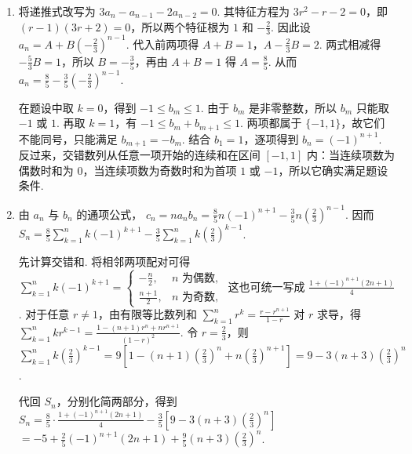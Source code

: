\begin{solution}
\begin{enumerate}
\item 将递推式改写为 \(3a_n-a_{n-1}-2a_{n-2}=0\). 其特征方程为 \(3r^2-r-2=0\)，即 \((r-1)(3r+2)=0\)，所以两个特征根为 \(1\) 和 \(-\frac23\). 因此设
\(a_n=A+B\left(-\frac23\right)^{n-1}\). 代入前两项得
\(A+B=1\)，\(A-\frac23B=2\). 两式相减得 \(-\frac53B=1\)，所以 \(B=-\frac35\)，再由 \(A+B=1\) 得 \(A=\frac85\). 从而
\(a_n=\frac85-\frac35\left(-\frac23\right)^{n-1}\).

在题设中取 \(k=0\)，得到 \(-1\leqslant b_m\leqslant1\). 由于 \(b_m\) 是非零整数，所以 \(b_m\) 只能取 \(-1\) 或 \(1\). 再取 \(k=1\)，有 \(-1\leqslant b_m+b_{m+1}\leqslant1\). 两项都属于 \(\{-1,1\}\)，故它们不能同号，只能满足 \(b_{m+1}=-b_m\). 结合 \(b_1=1\)，逐项得到 \(b_n=(-1)^{n+1}\). 反过来，交错数列从任意一项开始的连续和在区间 \([-1,1]\) 内：当连续项数为偶数时和为 \(0\)，当连续项数为奇数时和为首项 \(1\) 或 \(-1\)，所以它确实满足题设条件.

\item 由 \(a_n\) 与 \(b_n\) 的通项公式，
\(c_n=na_nb_n=\frac85n(-1)^{n+1}-\frac35n\left(\frac23\right)^{n-1}\). 因而
\(S_n=\frac85\sum_{k=1}^n k(-1)^{k+1}-\frac35\sum_{k=1}^n k\left(\frac23\right)^{k-1}\).

先计算交错和. 将相邻两项配对可得
\(\displaystyle\sum_{k=1}^n k(-1)^{k+1}=\begin{cases}
-\frac n2,&n\text{ 为偶数},\\[2pt]
\frac{n+1}{2},&n\text{ 为奇数},
\end{cases}\)
这也可统一写成 \(\displaystyle\frac{1+(-1)^{n+1}(2n+1)}4\). 对于任意 \(r\neq1\)，由有限等比数列和
\(\displaystyle\sum_{k=1}^n r^k=\frac{r-r^{n+1}}{1-r}\) 对 \(r\) 求导，得
\(\displaystyle\sum_{k=1}^n kr^{k-1}=\frac{1-(n+1)r^n+nr^{n+1}}{(1-r)^2}\). 令 \(r=\frac23\)，则
\(\displaystyle\sum_{k=1}^n k\left(\frac23\right)^{k-1}=9\left[1-(n+1)\left(\frac23\right)^n+n\left(\frac23\right)^{n+1}\right]=9-3(n+3)\left(\frac23\right)^n\).

代回 \(S_n\)，分别化简两部分，得到
\(S_n=\frac85\cdot\frac{1+(-1)^{n+1}(2n+1)}4-\frac35\left[9-3(n+3)\left(\frac23\right)^n\right]\)
\(=-5+\frac25(-1)^{n+1}(2n+1)+\frac95(n+3)\left(\frac23\right)^n\).
\end{enumerate}
\end{solution}
